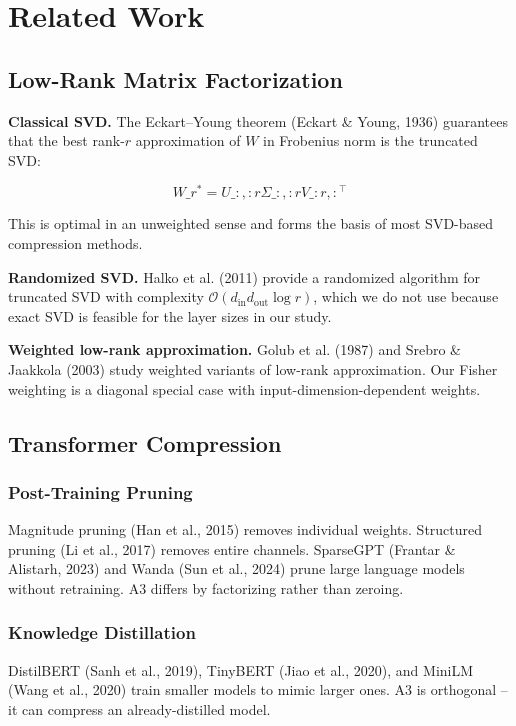
\section{Related Work}

\subsection{Low-Rank Matrix Factorization}

\textbf{Classical SVD.} The Eckart--Young theorem (Eckart \& Young, 1936) guarantees 
that the best rank-$r$ approximation of $W$ in Frobenius norm is the truncated 
SVD:

\[
W\_r^* = U\_{:, :r} \Sigma\_{:, :r} V\_{:r, :}^\top
\tag{2.1}
\]

This is optimal in an unweighted sense and forms the basis of most 
SVD-based compression methods.

\textbf{Randomized SVD.} Halko et al. (2011) provide a randomized algorithm for 
truncated SVD with complexity $\mathcal{O}(d_\text{in} d_\text{out} \log r)$, 
which we do not use because exact SVD is feasible for the layer sizes in our 
study.

\textbf{Weighted low-rank approximation.} Golub et al. (1987) and Srebro \& Jaakkola 
(2003) study weighted variants of low-rank approximation. Our Fisher weighting 
is a diagonal special case with input-dimension-dependent weights.

\subsection{Transformer Compression}

\subsubsection{Post-Training Pruning}

Magnitude pruning (Han et al., 2015) removes individual weights. Structured 
pruning (Li et al., 2017) removes entire channels. SparseGPT (Frantar \& 
Alistarh, 2023) and Wanda (Sun et al., 2024) prune large language models 
without retraining. A3 differs by factorizing rather than zeroing.

\subsubsection{Knowledge Distillation}

DistilBERT (Sanh et al., 2019), TinyBERT (Jiao et al., 2020), and MiniLM 
(Wang et al., 2020) train smaller models to mimic larger ones. A3 is 
orthogonal -- it can compress an already-distilled model.

